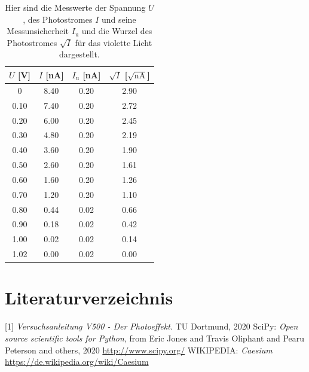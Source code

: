 \documentclass[titlepage = firstcover]{scrartcl}
\begin{document}
    \FloatBarrier
  
    \begin{table}[h]
      \centering
      \caption{Hier sind die Messwerte der Spannung $U$, des Photostromes $I$ und seine Messunsicherheit $I_{\text{u}}$ und die Wurzel des Photostromes $\sqrt{I}$ für das violette Licht dargestellt.}
      \label{tab:violettesLicht}
      \begin{tabular}{c c c c}
        \toprule
        {$U$ [V]} & {$I$ [nA]} & {$I_{\text{u}}$ [nA]} & {$\sqrt{I}$ [$\sqrt{\text{nA}}$]} \\
        \midrule
        0      &   8.40   &   0.20   &   2.90 \\
        0.10   &   7.40   &   0.20   &   2.72 \\
        0.20   &   6.00   &   0.20   &   2.45 \\
        0.30   &   4.80   &   0.20   &   2.19 \\
        0.40   &   3.60   &   0.20   &   1.90 \\
        0.50   &   2.60   &   0.20   &   1.61 \\
        0.60   &   1.60   &   0.20   &   1.26 \\
        0.70   &   1.20   &   0.20   &   1.10 \\
        0.80   &   0.44   &   0.02   &   0.66 \\
        0.90   &   0.18   &   0.02   &   0.42 \\
        1.00   &   0.02   &   0.02   &   0.14 \\
        1.02   &   0.00   &   0.02   &   0.00 \\
        \bottomrule
      \end{tabular}
    \end{table}

    \FloatBarrier
  
    \newpage
    \section{Literaturverzeichnis}
    [1] \textit{Versuchsanleitung V500 - Der Photoeffekt.} TU Dortmund, 2020 \newline
    [2] SciPy: \textit{Open source scientific tools for Python}, from Eric Jones and Travis Oliphant and Pearu Peterson and others, 2020
    \url{http://www.scipy.org/} \newline
    [3] WIKIPEDIA: \textit{Caesium}
    \url{https://de.wikipedia.org/wiki/Caesium}
\end{document}
